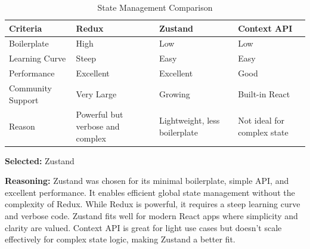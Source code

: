 \vspace{2em}

\begin{table}[H]
\centering
\caption{State Management Comparison}
\begin{tabular}{|l|p{4cm}|p{4cm}|p{4cm}|}
\hline
\textbf{Criteria}       & \textbf{Redux}              & \textbf{Zustand}              & \textbf{Context API}          \\
\hline
Boilerplate             & High                        & Low                          & Low                          \\
Learning Curve          & Steep                       & Easy                         & Easy                         \\
Performance             & Excellent                   & Excellent                    & Good                         \\
Community Support       & Very Large                  & Growing                      & Built-in React               \\
Reason                  & Powerful but verbose and complex & Lightweight, less boilerplate & Not ideal for complex state \\
\hline
\end{tabular}
\label{tab:state-management-comparison}
\end{table}

\textbf{Selected:} Zustand \par
\textbf{Reasoning:} Zustand was chosen for its minimal boilerplate, simple API, and excellent performance. It enables efficient global state management without the complexity of Redux. While Redux is powerful, it requires a steep learning curve and verbose code. Zustand fits well for modern React apps where simplicity and clarity are valued. Context API is great for light use cases but doesn’t scale effectively for complex state logic, making Zustand a better fit.

\vspace{2em}

